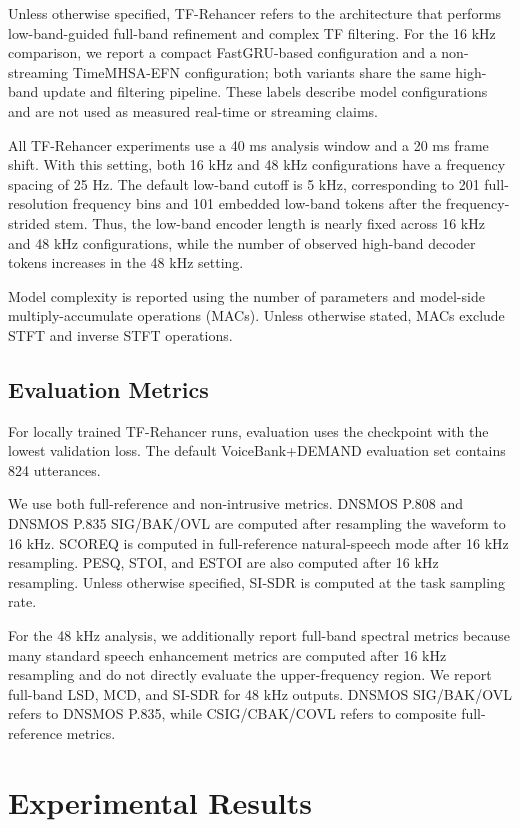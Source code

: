Unless otherwise specified, TF-Rehancer refers to the architecture that performs low-band-guided full-band refinement and complex TF filtering. For the 16 kHz comparison, we report a compact FastGRU-based configuration and a non-streaming TimeMHSA-EFN configuration; both variants share the same high-band update and filtering pipeline. These labels describe model configurations and are not used as measured real-time or streaming claims.

All TF-Rehancer experiments use a 40 ms analysis window and a 20 ms frame shift. With this setting, both 16 kHz and 48 kHz configurations have a frequency spacing of 25 Hz. The default low-band cutoff is 5 kHz, corresponding to 201 full-resolution frequency bins and 101 embedded low-band tokens after the frequency-strided stem. Thus, the low-band encoder length is nearly fixed across 16 kHz and 48 kHz configurations, while the number of observed high-band decoder tokens increases in the 48 kHz setting.

Model complexity is reported using the number of parameters and model-side multiply-accumulate operations (MACs). Unless otherwise stated, MACs exclude STFT and inverse STFT operations.

\subsection{Evaluation Metrics}
\label{sec:exp_evaluation_metrics}

For locally trained TF-Rehancer runs, evaluation uses the checkpoint with the lowest validation loss. The default VoiceBank+DEMAND evaluation set contains 824 utterances.

We use both full-reference and non-intrusive metrics. DNSMOS P.808 and DNSMOS P.835 SIG/BAK/OVL are computed after resampling the waveform to 16 kHz. SCOREQ is computed in full-reference natural-speech mode after 16 kHz resampling. PESQ, STOI, and ESTOI are also computed after 16 kHz resampling. Unless otherwise specified, SI-SDR is computed at the task sampling rate.

For the 48 kHz analysis, we additionally report full-band spectral metrics because many standard speech enhancement metrics are computed after 16 kHz resampling and do not directly evaluate the upper-frequency region. We report full-band LSD, MCD, and SI-SDR for 48 kHz outputs. DNSMOS SIG/BAK/OVL refers to DNSMOS P.835, while CSIG/CBAK/COVL refers to composite full-reference metrics.

\section{Experimental Results}
\label{sec:exp_results}

